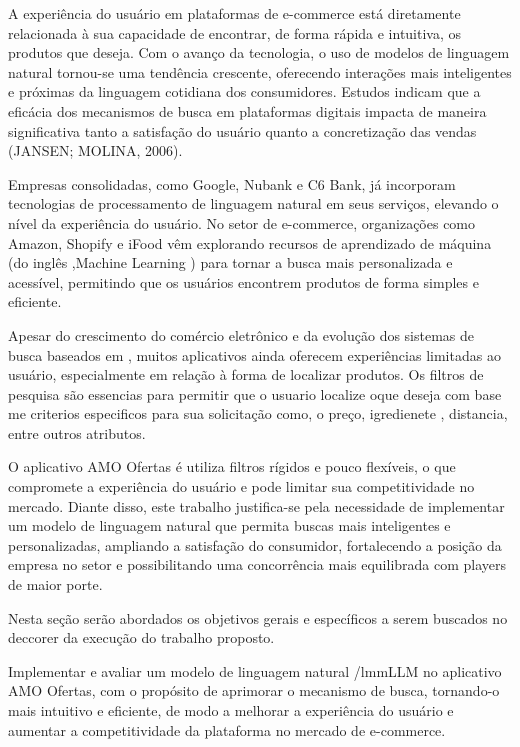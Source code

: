 \label{sec:problema-pesquisa-justificativa}

A experiência do usuário em plataformas de e-commerce está diretamente relacionada à sua capacidade de 
encontrar, de forma rápida e intuitiva, os produtos que deseja. Com o avanço da tecnologia, o uso de
 modelos de linguagem natural  tornou-se uma tendência crescente, oferecendo interações mais 
 inteligentes e próximas da linguagem cotidiana dos consumidores. Estudos indicam que a eficácia 
 dos mecanismos de busca em plataformas digitais impacta de maneira significativa tanto a satisfação 
 do usuário quanto a concretização das vendas (JANSEN; MOLINA, 2006).

Empresas consolidadas, como Google, Nubank e C6 Bank, já incorporam tecnologias de processamento de 
linguagem natural  em seus serviços, elevando o nível da experiência do usuário. 
No setor de e-commerce, organizações como Amazon, Shopify e iFood vêm explorando recursos de 
aprendizado de máquina (do inglês ,Machine Learning ) para tornar a busca mais personalizada e acessível, permitindo que 
os usuários encontrem produtos de forma simples e eficiente.

Apesar do crescimento do comércio eletrônico e da evolução dos sistemas de busca baseados em 
, muitos aplicativos ainda oferecem experiências limitadas ao usuário, especialmente em relação à forma de localizar produtos. Os filtros
de pesquisa são essencias para permitir que o usuario localize oque deseja com base me criterios especificos para sua solicitação
como, o preço, igredienete , distancia, entre outros atributos. 

O aplicativo AMO Ofertas é utiliza filtros rígidos e pouco flexíveis, 
o que compromete a experiência do usuário e pode limitar sua competitividade no mercado. 
Diante disso, este trabalho justifica-se pela necessidade de implementar um modelo de 
linguagem natural que permita buscas mais inteligentes e personalizadas, ampliando a 
satisfação do consumidor, fortalecendo a posição da empresa no setor e possibilitando uma 
concorrência mais equilibrada com players de maior porte.


\label{sec:objetivos}
Nesta seção serão abordados os objetivos gerais e específicos a serem buscados no deccorer da execução do trabalho proposto.

\label{ssec:objetivo-geral}

Implementar e avaliar um modelo de linguagem natural /lmm{LLM} no aplicativo AMO Ofertas, com o propósito de 
aprimorar o mecanismo de busca, tornando-o mais intuitivo e eficiente, de modo a melhorar 
a experiência do usuário e aumentar a competitividade da plataforma no mercado de e-commerce.

